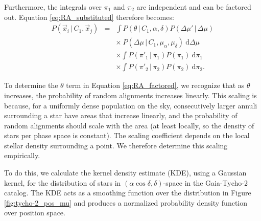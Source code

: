 \documentclass[usenatbib]{mnras}
\newcommand{\given}{\,|\,}
\newcommand{\dd}{\mathrm{d}}
\begin{document}
Furthermore, the integrals over $\pi_1$ and $\pi_2$ are independent and can be factored out. Equation \ref{eq:RA_substituted} therefore becomes:
\begin{eqnarray}
P(\vec{x}_i \given C_1, \vec{x}_j) &=& \int P(\theta \given C_1, \alpha, \delta) P(\Delta \mu' \given \Delta \mu) \nonumber \\
	& & \times\ P(\Delta \mu \given C_1, \mu_{\alpha}, \mu_{\delta})\ \dd \Delta \mu \nonumber \\
	& &  \times \int  P(\pi'_1 \given \pi_1) P(\pi_1)\ \dd \pi_1 \nonumber \\
	& &  \times \int  P(\pi'_2 \given \pi_2) P(\pi_2)\ \dd \pi_2. \label{eq:RA_factored}
\end{eqnarray}

To determine the $\theta$ term in Equation \ref{eq:RA_factored}, we recognize that as $\theta$ increases, the probability of random alignments increases linearly. This scaling is because, for a uniformly dense population on the sky, consecutively larger annuli surrounding a star have areas that increase linearly, and the probability of random alignments should scale with the area (at least locally, so the density of stars per phase space is constant). The scaling coefficient depends on the local stellar density surrounding a point. We therefore determine this scaling empirically. 

To do this, we calculate the kernel density estimate (KDE), using a Gaussian kernel, for the distribution of stars in $(\alpha \cos \delta, \delta)$-space in the Gaia-Tycho-2 catalog. The KDE acts as a smoothing function over the distribution in Figure \ref{fig:tycho-2_pos_mu} and produces a normalized probability density function over position space. 

\end{document}
